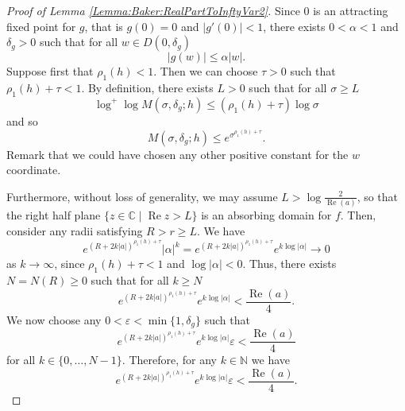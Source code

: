 \documentclass[a4paper, 12pt, twoside]{amsart}
\theoremstyle{definition}
\numberwithin{equation}{section}
\renewcommand{\Re}{\operatorname{Re}}
\newcommand{\re}{\operatorname{Re}}
\newcommand{\C}{{\mathbb C}}
\begin{document}
\begin{proof}[Proof of Lemma {\ref{Lemma:Baker:RealPartToInftyVar2}}]
    Since $0$ is an attracting fixed point for $g$, that is $g(0) = 0$ and $\lvert g'(0) \rvert < 1$, there exists $0 < \alpha < 1$ and $\delta_g > 0$ such that for all $w \in D(0,\delta_g)$
	\begin{equation}
		\lvert g(w) \rvert \leq \alpha \lvert w \rvert.
	\end{equation}
Suppose first that  $\rho_1(h) < 1$.  Then we can choose $\tau > 0$ such that ${\rho_1(h) + \tau < 1}$. By definition, there exists $L > 0$ such that for all $\sigma \geq L$
	\begin{equation*}
		\log^+ \log M(\sigma, \delta_g; h) \leq (\rho_1(h) + \tau) \log \sigma 
	\end{equation*}
	and so
	\begin{equation*}
		M(\sigma, \delta_g; h) \leq e^{\sigma^{\rho_1(h) + \tau}}.
	\end{equation*}
	Remark that we could have chosen any other positive constant for the $w$ coordinate. 
	
	Furthermore, without loss of generality, we may assume $L > \log \frac{2}{\Re(a)}$, so that the right half plane $\{z\in\C\mid \re z>L\}$ is an absorbing domain for $f$. %
	Then, consider any radii satisfying $R>r\ge L$.
	We have
	\begin{equation*}
		e^{(R + 2k \lvert a \rvert)^{\rho_1(h) + \tau}} \lvert \alpha \rvert^k  = e^{(R + 2k \lvert a \rvert)^{\rho_1(h) + \tau}} e^{k \log \lvert \alpha \rvert} \to 0
	\end{equation*}
	as $k \to \infty$, since $\rho_1(h) + \tau < 1$ and $\log\lvert \alpha \rvert < 0$. 
	Thus, there exists $N = N(R)\ge0$ such that for all $k \geq N$
	\begin{equation*}\label{Lemma:Baker:RealPartToInftyVar2:ProofPropN}
		e^{(R + 2k \lvert a \rvert)^{\rho_1(h) + \tau}} e^{k  \log \lvert \alpha \rvert} < \frac{\Re(a)}{4}.
	\end{equation*}
	We now choose any $0 < \varepsilon < \min\lbrace 1,\delta_g \rbrace$ such that
	\begin{equation*}\label{Lemma:Baker:RealPartToInftyVar2:ProofPropEps}
		e^{(R + 2k \lvert a \rvert)^{\rho_1(h) + \tau}} e^{k  \log \lvert \alpha \rvert} \varepsilon < \frac{\Re(a)}{4}
	\end{equation*}
	for all $k \in \lbrace 0, \dots, N-1 \rbrace$.
	Therefore, for any $k \in \mathbb{N}$ we have
	\begin{equation}\label{Lemma:Baker:RealPartToInftyVar2:ProofPropCombined}
		e^{(R + 2k \lvert a \rvert)^{\rho_1(h) + \tau}} e^{k  \log \lvert \alpha \rvert} \varepsilon < \frac{\Re(a)}{4}.
	\end{equation}
	

\end{proof}
\end{document}
